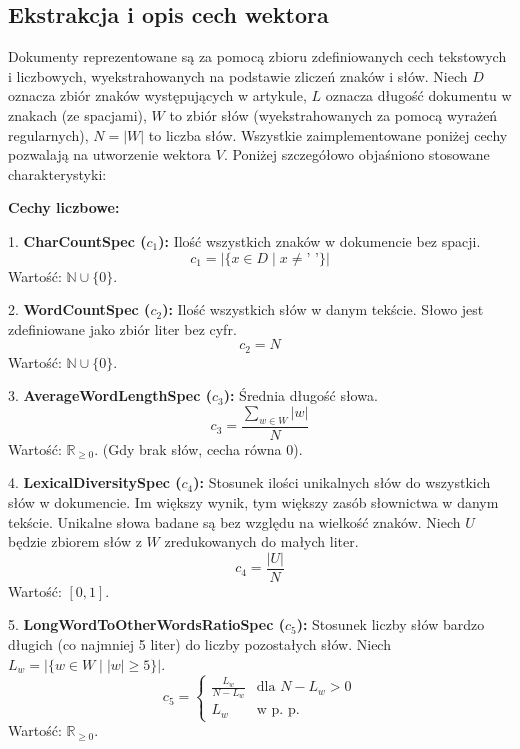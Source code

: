 \documentclass{article}
\begin{document}
\subsection{Ekstrakcja i opis cech wektora}
Dokumenty reprezentowane są za pomocą zbioru zdefiniowanych cech tekstowych i liczbowych, wyekstrahowanych na podstawie zliczeń znaków i słów. Niech $D$ oznacza zbiór znaków występujących w artykule, $L$ oznacza długość dokumentu w znakach (ze spacjami), $W$ to zbiór słów (wyekstrahowanych za pomocą wyrażeń regularnych), $N = |W|$ to liczba słów. Wszystkie zaimplementowane poniżej cechy pozwalają na utworzenie wektora $V$. Poniżej szczegółowo objaśniono stosowane charakterystyki:

\textbf{Cechy liczbowe:}

1. \textbf{CharCountSpec ($c_1$):} Ilość wszystkich znaków w dokumencie bez spacji.
   \begin{equation}
   c_1 = |\{x \in D \mid x \neq \text{' '}\}|
   \end{equation}
   Wartość: $\mathbb{N} \cup \{0\}$.

2. \textbf{WordCountSpec ($c_2$):} Ilość wszystkich słów w danym tekście. Słowo jest zdefiniowane jako zbiór liter bez cyfr.
   \begin{equation}
   c_2 = N
   \end{equation}
   Wartość: $\mathbb{N} \cup \{0\}$.

3. \textbf{AverageWordLengthSpec ($c_3$):} Średnia długość słowa.
   \begin{equation}
   c_3 = \frac{\sum_{w \in W} |w|}{N}
   \end{equation}
   Wartość: $\mathbb{R}_{\ge 0}$. (Gdy brak słów, cecha równa 0).

4. \textbf{LexicalDiversitySpec ($c_4$):} Stosunek ilości unikalnych słów do wszystkich słów w dokumencie. Im większy wynik, tym większy zasób słownictwa w danym tekście. Unikalne słowa badane są bez względu na wielkość znaków. Niech $U$ będzie zbiorem słów z $W$ zredukowanych do małych liter.
   \begin{equation}
   c_4 = \frac{|U|}{N}
   \end{equation}
   Wartość: $[0, 1]$.

5. \textbf{LongWordToOtherWordsRatioSpec ($c_5$):} Stosunek liczby słów bardzo długich (co najmniej 5 liter) do liczby pozostałych słów. Niech $L_w = |\{w \in W \mid |w| \ge 5\}|$.
   \begin{equation}
   c_5 = \begin{cases}
    \frac{L_w}{N - L_w} & \text{dla } N - L_w > 0 \\
    L_w & \text{w p. p.}
   \end{cases}
   \end{equation}
   Wartość: $\mathbb{R}_{\ge 0}$.
\end{document}
